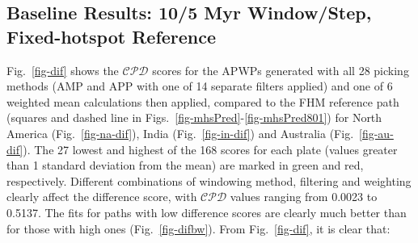 \subsection{Baseline Results: 10/5 Myr Window/Step, Fixed-hotspot
Reference}\label{sec:base}

Fig.~\ref{fig-dif} shows the $\mathcal{CPD}$ scores for the APWPs generated with
all 28 picking methods (AMP and APP with one of 14 separate filters applied) and
one of 6 weighted mean calculations then applied, compared to the FHM reference
path (squares and dashed line in Figs.~\ref{fig-mhsPred}-\ref{fig-mhsPred801})
for North America (Fig.~\ref{fig-na-dif}), India (Fig.~\ref{fig-in-dif}) and
Australia (Fig.~\ref{fig-au-dif}). The 27 lowest and highest of the 168
scores for each plate (values greater than 1 standard deviation from the mean)
are marked in green and red, respectively. Different combinations of windowing
method, filtering and weighting clearly affect the difference score, with
$\mathcal{CPD}$ values ranging from 0.0023 to 0.5137. The fits for paths with
low difference scores are clearly much better than for those with high ones
(Fig.~\ref{fig-difbw}). From Fig.~\ref{fig-dif}, it is clear that:

